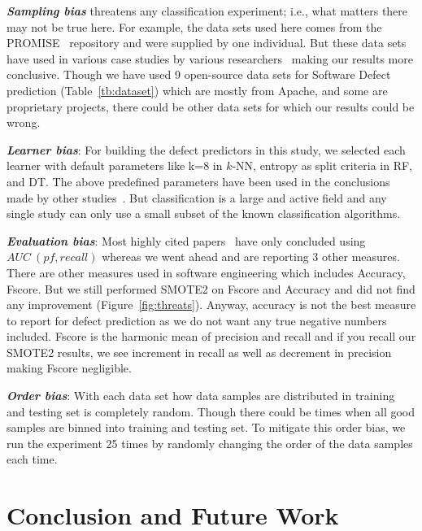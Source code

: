 \documentclass[sigconf,review, anonymous]{acmart}
\theoremstyle{break}
\theoremstyle{break}
\begin{document}
\textbf{\textit{Sampling bias}} threatens any classification experiment; i.e., what matters there may not be true here. For example, the data sets used here comes from the PROMISE~\cite{promiserepo} repository and were supplied by one individual. But these data sets have used in various case studies by various researchers~\cite{he2012investigation,peters2013better,peters2013balancing,turhan2013empirical} making our results more conclusive.
Though we have used 9 open-source data sets for Software Defect prediction (Table~\ref{tb:dataset}) which are mostly from Apache, and some are proprietary projects, there could be other data sets for which our results could be wrong.

\textbf{\textit{Learner bias}}: For building the defect predictors in this
study, we selected each learner with default parameters like k=8 in $k$-NN, entropy as split criteria in RF, and DT. The above predefined parameters have been used in the conclusions made by other studies~\cite{ghotra2015revisiting,tantithamthavorn2016automated}. But classification is a large and active field and any single study can only use a small subset of the known classification algorithms.

\textbf{\textit{Evaluation bias}}: Most highly cited papers~\cite{ghotra2015revisiting,tantithamthavorn2016automated} have only concluded using $AUC\ (pf, recall)$ whereas we went ahead and are reporting 3 other measures. There are other measures used in software engineering which includes Accuracy, Fscore. But we still performed SMOTE2 on Fscore and Accuracy and did not find any improvement (Figure~\ref{fig:threats}). Anyway, accuracy is not the best measure to report for defect prediction as we do not want any true negative numbers included. Fscore is the harmonic mean of precision and recall and if you recall our SMOTE2 results, we see  increment in recall as well as  decrement in precision making Fscore negligible.

\textbf{\textit{Order bias}}: With each data set how data samples are distributed in training and testing set is completely random. Though there could be times when all good samples are binned into training and testing set. To mitigate this order bias, we run
the experiment 25 times by randomly changing the order of the data samples each time.

\section{Conclusion and Future Work}
\label{sect:conclusion}
\end{document}

